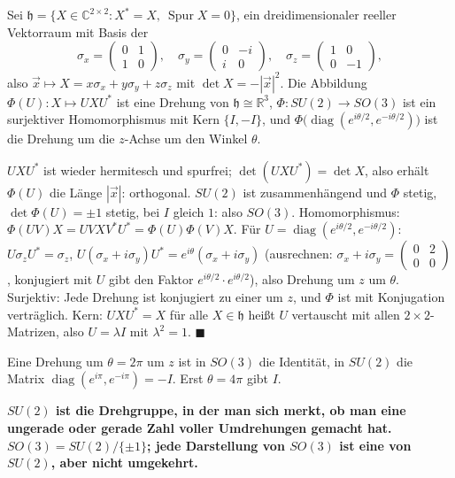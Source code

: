 \begin{merksatz}
Sei $\mathfrak h = \{X\in\mathbb C^{2\times2}\colon X^{*} = X,\ \operatorname{Spur}X = 0\}$, ein dreidimensionaler reeller Vektorraum mit Basis der 
\[ \sigma_x = \begin{pmatrix}0 & 1\\ 1 & 0\end{pmatrix},\quad\sigma_y = \begin{pmatrix}0 & -i\\ i & 0\end{pmatrix},\quad\sigma_z = \begin{pmatrix}1 & 0\\ 0 & -1\end{pmatrix}, \]
also $\vec x\mapsto X = x\sigma_x + y\sigma_y + z\sigma_z$ mit $\det X = -|\vec x|^{2}$. Die Abbildung $\Phi(U)\colon X\mapsto UXU^{*}$ ist eine Drehung von $\mathfrak h\cong\mathbb R^{3}$, $\Phi\colon SU(2)\to SO(3)$ ist ein surjektiver Homomorphismus mit Kern $\{I, -I\}$, und $\Phi\bigl(\operatorname{diag}(e^{i\theta/2}, e^{-i\theta/2})\bigr)$ ist die Drehung um die $z$-Achse um den Winkel $\theta$.

$UXU^{*}$ ist wieder hermitesch und spurfrei; $\det(UXU^{*}) = \det X$, also erhält $\Phi(U)$ die Länge $|\vec x|$: orthogonal. $SU(2)$ ist zusammenhängend und $\Phi$ stetig, $\det\Phi(U) = \pm1$ stetig, bei $I$ gleich $1$: also $SO(3)$. Homomorphismus: $\Phi(UV)X = UVXV^{*}U^{*} = \Phi(U)\Phi(V)X$. Für $U = \operatorname{diag}(e^{i\theta/2}, e^{-i\theta/2})$: $U\sigma_zU^{*} = \sigma_z$, $U(\sigma_x + i\sigma_y)U^{*} = e^{i\theta}(\sigma_x + i\sigma_y)$ (ausrechnen: $\sigma_x + i\sigma_y = \begin{pmatrix}0 & 2\\ 0 & 0\end{pmatrix}$, konjugiert mit $U$ gibt den Faktor $e^{i\theta/2}\cdot e^{i\theta/2}$), also Drehung um $z$ um $\theta$. Surjektiv: Jede Drehung ist konjugiert zu einer um $z$, und $\Phi$ ist mit Konjugation verträglich. Kern: $UXU^{*} = X$ für alle $X\in\mathfrak h$ heißt $U$ vertauscht mit allen $2\times2$-Matrizen, also $U = \lambda I$ mit $\lambda^{2} = 1$. $\blacksquare$

Eine Drehung um $\theta = 2\pi$ um $z$ ist in $SO(3)$ die Identität, in $SU(2)$ die Matrix $\operatorname{diag}(e^{i\pi}, e^{-i\pi}) = -I$. Erst $\theta = 4\pi$ gibt $I$.

\begin{center}
\begin{minipage}{0.9\textwidth}
\textbf{$SU(2)$ ist die Drehgruppe, in der man sich merkt, ob man eine ungerade oder gerade Zahl voller Umdrehungen gemacht hat. $SO(3) = SU(2)/\{\pm1\}$; jede Darstellung von $SO(3)$ ist eine von $SU(2)$, aber nicht umgekehrt.}
\end{minipage}
\end{center}
\end{merksatz}

